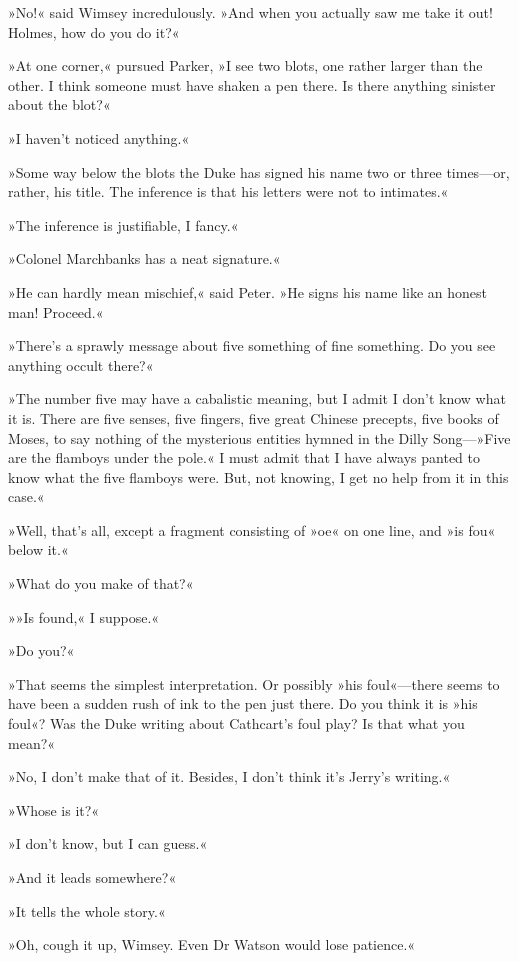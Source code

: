 »No!« said Wimsey incredulously. »And when you actually saw me take it out! Holmes, how do you do it?«

»At one corner,« pursued Parker, »I see two blots, one rather larger than the other. I think someone must have shaken a pen there. Is there anything sinister about the blot?«

»I haven't noticed anything.«

»Some way below the blots the Duke has signed his name two or three times\allowbreak---\allowbreak or, rather, his title. The inference is that his letters were not to intimates.«

»The inference is justifiable, I fancy.«

»Colonel Marchbanks has a neat signature.«

»He can hardly mean mischief,« said Peter. »He signs his name like an honest man! Proceed.«

»There's a sprawly message about five something of fine something. Do you see anything occult there?«

»The number five may have a cabalistic meaning, but I admit I don't know what it is. There are five senses, five fingers, five great Chinese precepts, five books of Moses, to say nothing of the mysterious entities hymned in the Dilly Song---»Five are the flamboys under the pole.« I must admit that I have always panted to know what the five flamboys were. But, not knowing, I get no help from it in this case.«

»Well, that's all, except a fragment consisting of »oe« on one line, and »is fou\longdash« below it.«

»What do you make of that?«

»»Is found,« I suppose.«

»Do you?«

»That seems the simplest interpretation. Or possibly »his foul«---there seems to have been a sudden rush of ink to the pen just there. Do you think it is »his foul«? Was the Duke writing about Cathcart's foul play? Is that what you mean?«

»No, I don't make that of it. Besides, I don't think it's Jerry's writing.«

»Whose is it?«

»I don't know, but I can guess.«

»And it leads somewhere?«

»It tells the whole story.«

»Oh, cough it up, Wimsey. Even Dr Watson would lose patience.«

